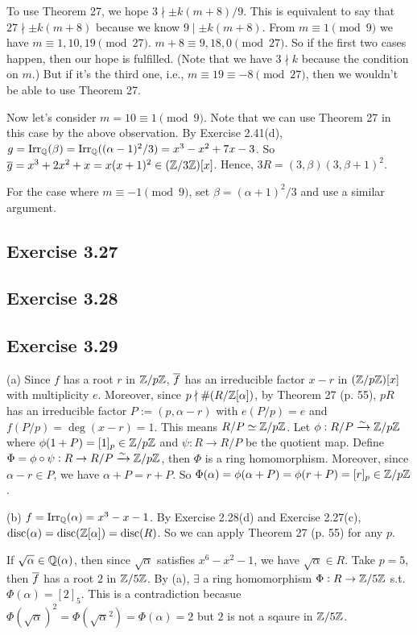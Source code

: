 \documentclass[../Marcus.tex]{subfiles}
\begin{document}
To use Theorem 27, we hope $3\nmid \pm k(m+8)/9$. This is equivalent to say that $27\nmid \pm k(m+8)$ because we know $9\mid \pm k(m+8)$. From $m\equiv 1 \pmod{9}$ we have $m\equiv 1,10,19 \pmod{27}$. $m+8\equiv 9,18,0 \pmod{27}$. So if the first two cases happen, then our hope is fulfilled. (Note that we have $3\nmid k$ because the condition on $m$.) But if it's the third one, i.e., $m\equiv 19\equiv -8 \pmod{27}$, then we wouldn't be able to use Theorem 27.

Now let's consider $m=10\equiv 1\pmod{9}$. Note that we can use Theorem 27 in this case by the above observation. By Exercise 2.41(d), $g=\operatorname{Irr}_{\mathbb{Q}}(\beta)=\operatorname{Irr}_{\mathbb{Q}}((\alpha-1)^2/3)=x^3-x^2+7x-3$. So $\overline{g}=x^3+2x^2+x=x(x+1)^2\in(\mathbb{Z}/3\mathbb{Z})[x]$. Hence, $3R=(3,\beta)(3,\beta+1)^2$.

For the case where $m\equiv -1\pmod{9}$, set $\beta=(\alpha+1)^2/3$ and use a similar argument.

\subsection*{Exercise 3.27}

\subsection*{Exercise 3.28}

\subsection*{Exercise 3.29}

(a) Since $f$ has a root $r$ in $\mathbb{Z}/p\mathbb{Z}$, $\overline{f}$ has an irreducible factor $x-r$ in $(\mathbb{Z}/p\mathbb{Z})[x]$ with multiplicity $e$. Moreover, since $p\nmid \#(R/\mathbb{Z}[\alpha])$, by Theorem 27 (p. 55), $pR$ has an irreducible factor $P:=(p,\alpha-r)$ with $e(P/p)=e$ and $f(P/p)=\deg(x-r)=1$. This means $R/P\simeq \mathbb{Z}/p\mathbb{Z}$. Let $\phi:R/P\xrightarrow{\sim}\mathbb{Z}/p\mathbb{Z}$ where $\phi(1+P)=[1]_p\in\mathbb{Z}/p\mathbb{Z}$ and $\psi:R\to R/P$ be the quotient map. Define $\Phi=\phi\circ\psi:R\to R/P\xrightarrow{\sim}\mathbb{Z}/p\mathbb{Z}$, then $\Phi$ is a ring homomorphism. Moreover, since $\alpha-r\in P$, we have $\alpha+P=r+P$. So $\Phi(\alpha)=\phi(\alpha+P)=\phi(r+P)=[r]_p\in\mathbb{Z}/p\mathbb{Z}$.

(b) $f=\operatorname{Irr}_{\mathbb{Q}}(\alpha)=x^3-x-1$. By Exercise 2.28(d) and Exercise 2.27(c), $\operatorname{disc}(\alpha)=\operatorname{disc}(\mathbb{Z}[\alpha])=\operatorname{disc}(R)$. So we can apply Theorem 27 (p. 55) for any $p$.

If $\sqrt{\alpha}\in\mathbb{Q}(\alpha)$, then since $\sqrt{\alpha}$ satisfies $x^6-x^2-1$, we have $\sqrt{\alpha}\in R$. Take $p=5$, then $\overline{f}$ has a root $2$ in $\mathbb{Z}/5\mathbb{Z}$. By (a), $\exists$ a ring homomorphism $\Phi:R\to\mathbb{Z}/5\mathbb{Z}$ s.t. $\Phi(\alpha)=[2]_5$. This is a contradiction becasue $\Phi(\sqrt{\alpha})^2=\Phi(\sqrt{\alpha}^2)=\Phi(\alpha)=2$ but $2$ is not a sqaure in $\mathbb{Z}/5\mathbb{Z}$.
\end{document}
